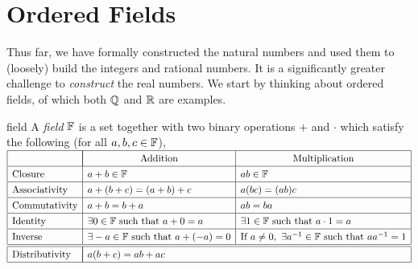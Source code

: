 \clearpage



\section{Ordered Fields}

Thus far, we have formally constructed the natural numbers and used them to (loosely) build the integers and rational numbers. It is a significantly greater challenge to \emph{construct} the real numbers. We start by thinking about ordered fields, of which both $\mathbb{Q}$ and $\mathbb{R}$ are examples.

\begin{axioms}{}{field}
	A \emph{field} $\mathbb{F}$ is a set together with two binary operations $+$ and $\cdot$ which satisfy the following (for all $a,b,c\in\mathbb{F}$),\footnotemark
	\medbreak
	$\def\arraystretch{1.3}
	\begin{array}{|l|l|l|}
	\hline
	&\multicolumn{1}{|c|}{\text{Addition}}
	&
	\multicolumn{1}{c|}{\text{Multiplication}}\\\hline
	\text{Closure}&a+b\in\F &ab\in\F\\\hline
	\text{Associativity}&a+(b+c)=(a+b)+c &a(bc)=(ab)c\\\hline
	\text{Commutativity}&a+b=b+a &ab=ba\\\hline
	\text{Identity}&\exists 0\in\F\text{ such that }a+0=a &\exists 1\in\F \text{ such that }a\cdot 1=a\\\hline
	\text{Inverse}&\exists -a\in\F \text{ such that }a+(-a)=0 &\text{If }a\neq 0,\ \exists a^{-1}\in\F\text{ such that }aa^{-1}=1\\\hline\hline
	\text{Distributivity}&\multicolumn{2}{|l|}{a(b+c)=ab+ac}\\\hline
	\end{array}
	$
	\bigbreak

\end{axioms}
